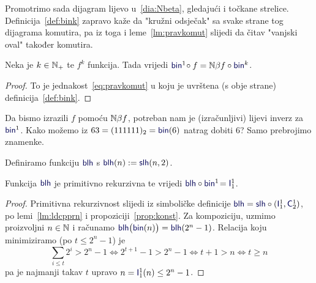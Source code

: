 
Promotrimo sada dijagram lijevo u~\eqref{dia:Nbeta}, gledajući i točkane strelice. Definicija~\ref{def:bink} zapravo kaže da "kružni odsječak" sa svake strane tog dijagrama komutira, pa iz toga i leme~\ref{lm:pravkomut} slijedi da čitav "\!vanjski oval" također komutira.

\begin{korolar}[{name=[brojevni-brojevni dijagram komutira]}]\label{kor:binf=Nbetafbin}
Neka je $k\in{\mathbb N}_+$ te $f^k$ funkcija. Tada vrijedi
    $\f{bin}^1\!\circ f=\N\beta f\circ\f{bin}^k$.
\end{korolar}
\begin{proof}
To je jednakost~\eqref{eq:pravkomut} u koju je uvrštena (s obje strane) definicija~\ref{def:bink}.
\end{proof}


Da bismo izrazili $f$ pomoću ${\mathbb N}\beta f$, potreban nam je (izračunljivi) lijevi inverz za $\f{bin}^1$. Kako možemo iz $63=(111111)_2=\f{bin}(6)$ natrag dobiti $6$? Samo prebrojimo znamenke.

\begin{lema}[{name=[primitivna rekurzivnost i specifikacija duljine binarnog zapisa]}]\label{lm:blh}
Definiramo funkciju $\f{blh}$ s $\f{blh}(n):=\f{slh}(n,2)$.

Funkcija $\f{blh}$ je primitivno rekurzivna te vrijedi $\f{blh}\circ\f{bin}^1\!=\f I_1^1$.
\end{lema}
\begin{proof}
Primitivna rekurzivnost slijedi iz simboličke definicije $\f{blh}=\f{slh}\circ(\f I_1^1,\f C_2^1)$, po lemi~\ref{lm:ldcpprn} i propoziciji~\ref{prop:konst}.
Za kompoziciju, uzmimo proizvoljni $n\in{\mathbb N}$ i računamo $\f{blh}\bigl(\f{bin}(n)\bigr)=\f{blh}(2^n-1)$. Relacija koju minimiziramo (po $t\le 2^n-1$) je
\begin{equation}
    \textstyle\sum_{i\le t}2^i>2^n-1
    \Longleftrightarrow
    2^{t+1}-1>2^n-1
    \Longleftrightarrow
    t+1>n
    \Longleftrightarrow
    t\ge n
\end{equation}
pa je najmanji takav $t$ upravo $n=\f I_1^1(n)\le2^n-1$.\qedhere
\end{proof}

